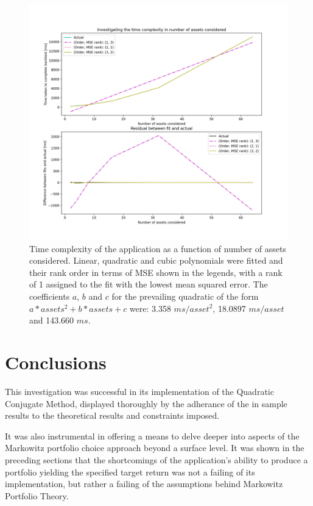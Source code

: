 \documentclass{article}
\begin{document}
\begin{figure}[H]
	\centerline{\includegraphics[width=\textwidth]{figures/time_complexity_in_assets.png}}
	\caption{Time complexity of the application as a function of number of assets considered. Linear, quadratic and cubic polynomials were fitted and their rank order in terms of MSE shown in the legends, with a rank of 1 assigned to the fit with the lowest mean squared error. The coefficients $a$, $b$ and $c$ for the prevailing quadratic of the form $a* assets^2 + b * assets + c$ were: 3.358 $ms/asset^{2}$, 18.0897 $ms/asset$ and 143.660 $ms$.}
	\label{fig:time_complexity_in_assets}
\end{figure}



\section{Conclusions}
\label{sec:concs}


This investigation was successful in its implementation of the Quadratic Conjugate Method, displayed thoroughly by the adherance of the in sample results to the theoretical results and constraints imposed.

It was also instrumental in offering a means to delve deeper into aspects of the Markowitz portfolio choice approach beyond a surface level. It was shown in the preceding sections that the shortcomings of the application's ability to produce a portfolio yielding the specified target return was not a failing of its implementation, but rather a failing of the assumptions behind Markowitz Portfolio Theory.
\end{document}
